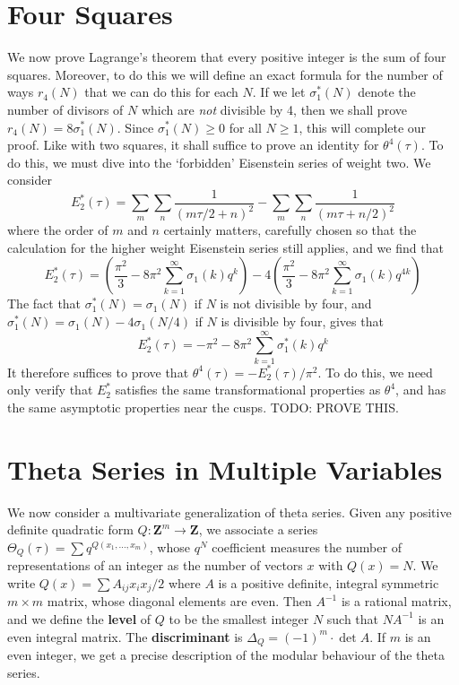 \documentclass{article}
\theoremstyle{plain}
\theoremstyle{remark}
\theoremstyle{definition}
\begin{document}
\section{Four Squares}

We now prove Lagrange's theorem that every positive integer is the sum of four squares. Moreover, to do this we will define an exact formula for the number of ways $r_4(N)$ that we can do this for each $N$. If we let $\sigma_1^*(N)$ denote the number of divisors of $N$ which are {\it not} divisible by 4, then we shall prove $r_4(N) = 8 \sigma_1^*(N)$. Since $\sigma_1^*(N) \geq 0$ for all $N \geq 1$, this will complete our proof. Like with two squares, it shall suffice to prove an identity for $\theta^4(\tau)$. To do this, we must dive into the `forbidden' Eisenstein series of weight two. We consider
%
\[ E_2^*(\tau) = \sum_m \sum_n \frac{1}{(m\tau/2 + n)^2} - \sum_m \sum_n \frac{1}{(m \tau + n/2)^2} \]
%
where the order of $m$ and $n$ certainly matters, carefully chosen so that the calculation for the higher weight Eisenstein series still applies, and we find that
%
\[ E_2^*(\tau) = \left( \frac{\pi^2}{3} - 8 \pi^2 \sum_{k = 1}^\infty \sigma_1(k) q^k \right) - 4 \left( \frac{\pi^2}{3} - 8 \pi^2 \sum_{k = 1}^\infty \sigma_1(k) q^{4k} \right) \]
%
The fact that $\sigma_1^*(N) = \sigma_1(N)$ if $N$ is not divisible by four, and $\sigma_1^*(N) = \sigma_1(N) - 4 \sigma_1(N/4)$ if $N$ is divisible by four, gives that
%
\[ E_2^*(\tau) = - \pi^2 - 8 \pi^2 \sum_{k = 1}^\infty \sigma_1^*(k) q^k \]
%
It therefore suffices to prove that $\theta^4(\tau) = -E_2^*(\tau)/\pi^2$. To do this, we need only verify that $E_2^*$ satisfies the same transformational properties as $\theta^4$, and has the same asymptotic properties near the cusps. TODO: PROVE THIS.

\section{Theta Series in Multiple Variables}

We now consider a multivariate generalization of theta series. Given any positive definite quadratic form $Q: \mathbf{Z}^m \to \mathbf{Z}$, we associate a series $\Theta_Q(\tau) = \sum q^{Q(x_1, \dots, x_m)}$, whose $q^N$ coefficient measures the number of representations of an integer as the number of vectors $x$ with $Q(x) = N$. We write $Q(x) = \sum A_{ij} x_ix_j/2$ where $A$ is a positive definite, integral symmetric $m \times m$ matrix, whose diagonal elements are even. Then $A^{-1}$ is a rational matrix, and we define the {\bf level} of $Q$ to be the smallest integer $N$ such that $NA^{-1}$ is an even integral matrix. The {\bf discriminant} is $\Delta_Q = (-1)^m \cdot \det A$. If $m$ is an even integer, we get a precise description of the modular behaviour of the theta series.
\end{document}
